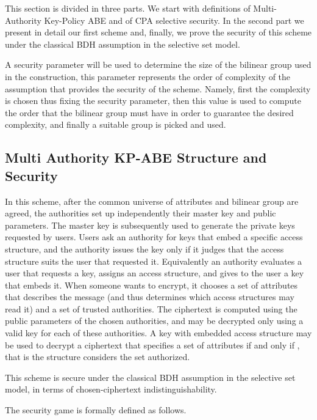 

This section is divided in three parts. We start with  definitions of Multi-Authority Key-Policy ABE and of CPA selective security. In the second part we present in detail our first scheme and, finally, we prove the security of this scheme under the classical BDH assumption in the selective set model.

A security parameter will be used to determine the size of the bilinear group used in the construction, this parameter represents the order of complexity of the assumption that provides the security of the scheme.
Namely, first the complexity is chosen thus fixing the security parameter, then this value is used to compute the order that the bilinear group must have in order to guarantee the desired complexity, and finally a suitable group is picked and used.

\subsection{Multi Authority KP-ABE Structure and Security}\label{KP-ABE}

  In this scheme, after the common universe of attributes and bilinear group are agreed, the authorities set up independently their master key and public parameters.
  The master key is subsequently used to generate the private keys requested by users.
  Users ask an authority for keys that embed a specific access structure, and the authority issues the key only if it judges that the access structure suits the user that requested it.
  Equivalently an authority evaluates a user that requests a key, assigns an access structure, and gives to the user a key that embeds it.
  When someone wants to encrypt, it chooses a set of attributes that describes the message (and thus determines which access structures may read it) and a set of trusted authorities.
  The ciphertext is computed using the public parameters of the chosen authorities, and may be decrypted only using a valid key for each of these authorities.
  A key with embedded access structure  may be used to decrypt a ciphertext that specifies a set of attributes  if and only if , that is the structure considers the set authorized.

  This scheme is secure under the classical BDH assumption in the selective set model, in terms of chosen-ciphertext indistinguishability.

  The security game is formally defined as follows.\\

